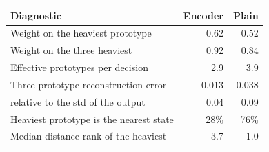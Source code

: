 \begin{tabular}{@{}lrr@{}}
\toprule
Diagnostic & Encoder & Plain \\
\midrule
Weight on the heaviest prototype & 0.62 & 0.52 \\
Weight on the three heaviest & 0.92 & 0.84 \\
Effective prototypes per decision & 2.9 & 3.9 \\
Three-prototype reconstruction error & 0.013 & 0.038 \\
\quad relative to the std of the output & 0.04 & 0.09 \\
Heaviest prototype is the nearest state & 28\% & 76\% \\
Median distance rank of the heaviest & 3.7 & 1.0 \\
\bottomrule
\end{tabular}

